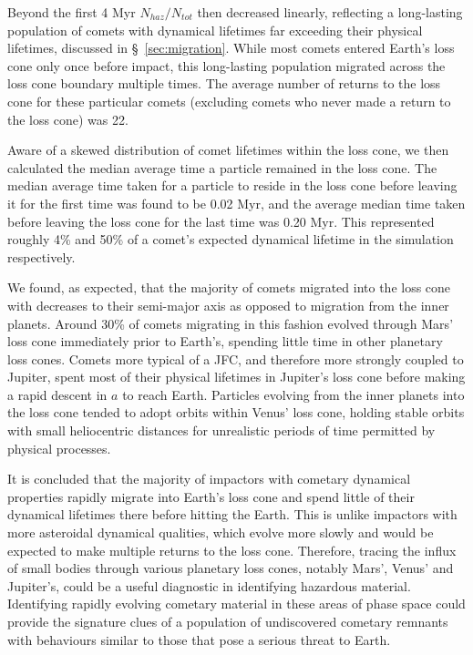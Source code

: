 Beyond the first 4 Myr $N_{haz}/N_{tot}$ then decreased linearly, reflecting a long-lasting population of comets with dynamical lifetimes far exceeding their physical lifetimes, discussed in \S~\ref{sec:migration}. While most comets entered Earth's loss cone only once before impact, this long-lasting population migrated across the loss cone boundary multiple times. The average number of returns to the loss cone for these particular comets (excluding comets who never made a return to the loss cone) was 22.

Aware of a skewed distribution of comet lifetimes within the loss cone, we then calculated the median average time a particle remained in the loss cone. The median average time taken for a particle to reside in the loss cone before leaving it for the first time was found to be 0.02 Myr, and the average median time taken before leaving the loss cone for the last time was 0.20 Myr. This represented roughly 4\% and 50\% of a comet's expected dynamical lifetime in the simulation respectively.

We found, as expected, that the majority of comets migrated into the loss cone with decreases to their semi-major axis as opposed to migration from the inner planets. Around 30\% of comets migrating in this fashion evolved through Mars' loss cone immediately prior to Earth's, spending little time in other planetary loss cones. Comets more typical of a JFC, and therefore more strongly coupled to Jupiter, spent most of their physical lifetimes in Jupiter's loss cone before making a rapid descent in $a$ to reach Earth. Particles evolving from the inner planets into the loss cone tended to adopt orbits within Venus' loss cone, holding stable orbits with small heliocentric distances for unrealistic periods of time permitted by physical processes.

It is concluded that the majority of impactors with cometary dynamical properties rapidly migrate into Earth's loss cone and spend little of their dynamical lifetimes there before hitting the Earth. This is unlike impactors with more asteroidal dynamical qualities, which evolve more slowly and would be expected to make multiple returns to the loss cone. Therefore, tracing the influx of small bodies through various planetary loss cones, notably Mars', Venus' and Jupiter's, could be a useful diagnostic in identifying hazardous material. Identifying rapidly evolving cometary material in these areas of phase space could provide the signature clues of a population of undiscovered cometary remnants with behaviours similar to those that pose a serious threat to Earth.

